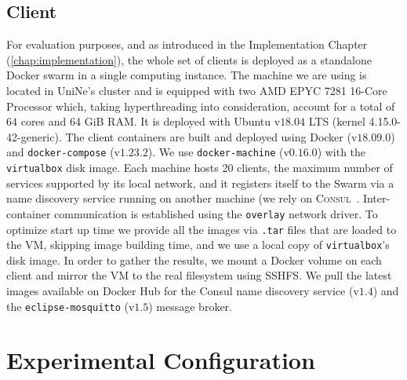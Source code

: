 \subsection{Client} \label{sec:evaluation:hardware:client}
For evaluation purposes, and as introduced in the Implementation Chapter (\ref{chap:implementation}), the whole set of clients is deployed as a standalone Docker swarm in a single computing instance. 
The machine we are using is located in UniNe's cluster and is equipped with two AMD EPYC 7281 16-Core Processor which, taking hyperthreading into consideration, account for a total of 64 cores and 64 GiB RAM. 
It is deployed with Ubuntu v$18.04$ LTS (kernel 4.15.0-42-generic). 
The client containers are built and deployed using Docker (v$18.09.0$) and \texttt{docker-compose} (v$1.23.2$). 
We use \texttt{docker-machine} (v$0.16.0$) with the \texttt{virtualbox} disk image. 
Each machine hosts 20 clients, the maximum number of services supported by its local network, and it registers itself to the Swarm via a name discovery service running on another machine (we rely on \textsc{Consul}~\cite{consul-image}.
Inter-container communication is established using the \texttt{overlay} network driver.
To optimize start up time we provide all the images via \texttt{.tar} files that are loaded to the VM, skipping image building time, and we use a local copy of \texttt{virtualbox}'s disk image.
In order to gather the results, we mount a Docker volume on each client and mirror the VM to the real filesystem using SSHFS. 
We pull the latest images available on Docker Hub for the Consul name discovery service (v$1.4$) and the \texttt{eclipse-mosquitto} (v$1.5$) message broker.

\section{Experimental Configuration} \label{sec:evaluation:experiments}

